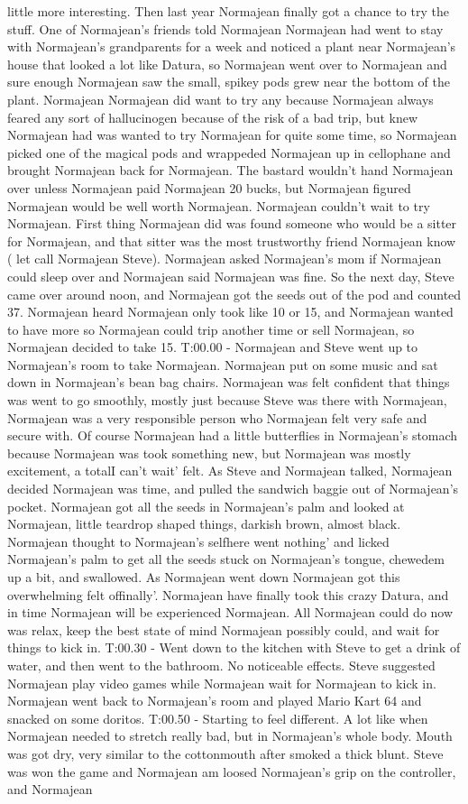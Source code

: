 \documentclass[12pt]{book}
\begin{document}
little more interesting. Then last year Normajean finally got a chance to try the stuff. One of Normajean's friends told Normajean Normajean had went to stay with Normajean's grandparents for a week and noticed a plant near Normajean's house that looked a lot like Datura, so Normajean went over to Normajean and sure enough Normajean saw the small, spikey pods grew near the bottom of the plant. Normajean Normajean did want to try any because Normajean always feared any sort of hallucinogen because of the risk of a bad trip, but knew Normajean had was wanted to try Normajean for quite some time, so Normajean picked one of the magical pods and wrappeded Normajean up in cellophane and brought Normajean back for Normajean. The bastard wouldn't hand Normajean over unless Normajean paid Normajean 20 bucks, but Normajean figured Normajean would be well worth Normajean. Normajean couldn't wait to try Normajean. First thing Normajean did was found someone who would be a sitter for Normajean, and that sitter was the most trustworthy friend Normajean know ( let call Normajean Steve). Normajean asked Normajean's mom if Normajean could sleep over and Normajean said Normajean was fine. So the next day, Steve came over around noon, and Normajean got the seeds out of the pod and counted 37. Normajean heard Normajean only took like 10 or 15, and Normajean wanted to have more so Normajean could trip another time or sell Normajean, so Normajean decided to take 15. T:00.00 - Normajean and Steve went up to Normajean's room to take Normajean. Normajean put on some music and sat down in Normajean's bean bag chairs. Normajean was felt confident that things was went to go smoothly, mostly just because Steve was there with Normajean, Normajean was a very responsible person who Normajean felt very safe and secure with. Of course Normajean had a little butterflies in Normajean's stomach because Normajean was took something new, but Normajean was mostly excitement, a totalI can't wait' felt. As Steve and Normajean talked, Normajean decided Normajean was time, and pulled the sandwich baggie out of Normajean's pocket. Normajean got all the seeds in Normajean's palm and looked at Normajean, little teardrop shaped things, darkish brown, almost black. Normajean thought to Normajean's selfhere went nothing' and licked Normajean's palm to get all the seeds stuck on Normajean's tongue, chewedem up a bit, and swallowed. As Normajean went down Normajean got this overwhelming felt offinally'. Normajean have finally took this crazy Datura, and in time Normajean will be experienced Normajean. All Normajean could do now was relax, keep the best state of mind Normajean possibly could, and wait for things to kick in. T:00.30 - Went down to the kitchen with Steve to get a drink of water, and then went to the bathroom. No noticeable effects. Steve suggested Normajean play video games while Normajean wait for Normajean to kick in. Normajean went back to Normajean's room and played Mario Kart 64 and snacked on some doritos. T:00.50 - Starting to feel different. A lot like when Normajean needed to stretch really bad, but in Normajean's whole body. Mouth was got dry, very similar to the cottonmouth after smoked a thick blunt. Steve was won the game and Normajean am loosed Normajean's grip on the controller, and Normajean 
\end{document}
